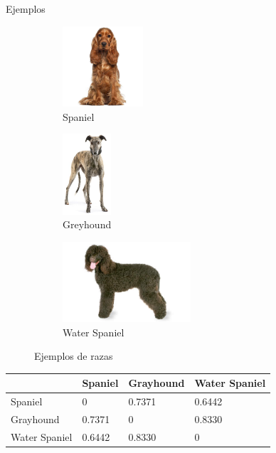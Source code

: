 \documentclass{beamer}
\begin{document}
\begin{frame}{Ejemplos}

\begin{figure}[H] 
	\centering
	\begin{subfigure}[b]{0.3\textwidth}
		\includegraphics[height=3cm] {Images/examples/spaniel.jpg}
		\caption{Spaniel \label{fig:spaniel}}
	\end{subfigure}
	\begin{subfigure}[b]{0.3\textwidth}
		\centering
		\includegraphics[height=3cm]  {Images/examples/greyhound.jpg}
		\caption{Greyhound \label{fig:greyhound}}
	\end{subfigure}
	\begin{subfigure}[b]{0.3\textwidth}
		\includegraphics[height=3cm]{Images/examples/waterspaniel.jpg}
		\caption{Water Spaniel\label{fig:waterspaniel}}
	\end{subfigure}       
	\caption{Ejemplos de razas\label{fig:dogexample}}
\end{figure}

\begin{table}[H]
\centering
\begin{tabular}{l|l|l|l}
              & Spaniel & Grayhound & Water Spaniel               \\ \hline
Spaniel       & 0       & 0.7371    & \multicolumn{1}{l|}{0.6442} \\ \hline
Grayhound     & 0.7371  & 0         & \multicolumn{1}{l|}{0.8330} \\ \hline
Water Spaniel & 0.6442  & 0.8330    & \multicolumn{1}{l|}{0}      \\ \cline{2-4} 
\end{tabular}
\end{table}
\end{frame}
\end{document}
